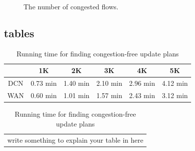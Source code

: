 \begin{figure}[t]
\begin{minipage}[t]{0.49\textwidth}
\caption{Maximum link congestion comparison.}
\label{fig:LinkCongestion}
\end{minipage}
\begin{minipage}[t]{0.49\textwidth}
\caption{The number of congested flows.}
\label{fig:RunningTime}
\end{minipage}
\vspace{-1em}
\end{figure}

\subsection{tables}

\begin{table}[H]
\caption{Running time for finding congestion-free update plans}\label{Tab:RunningTime}
\centering
\begin{tabular}{|c|c|c|c|c|c|}
\hline
& 1K & 2K & 3K & 4K & 5K  \\
\hline
DCN & 0.73 min & 1.40 min & 2.10 min & 2.96 min &  4.12 min  \\
\hline
WAN & 0.60 min & 1.01 min & 1.57 min & 2.43 min & 3.12 min  \\
\hline
\end{tabular}
\begin{tabular}{l}
\\
write something to explain your table in here
\end{tabular}
\end{table}
